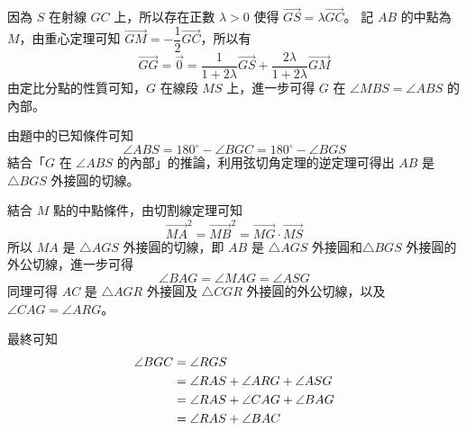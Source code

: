 \setcounter{equation}{0}
因為 $S$ 在射線 $GC$ 上，所以存在正數 $\lambda > 0$ 使得 $\overrightarrow{GS}=\lambda\overrightarrow{GC}$。
記 $AB$ 的中點為 $M$，由重心定理可知 $\overrightarrow{GM}=-\dfrac{1}{2}\overrightarrow{GC}$，所以有
\begin{equation}
  \overrightarrow{GG}=\overrightarrow{0}=\frac{1}{1+2\lambda}\overrightarrow{GS}+\frac{2\lambda}{1+2\lambda}\overrightarrow{GM}
\end{equation}
由定比分點的性質可知，$G$ 在線段 $MS$ 上，進一步可得 $G$ 在 $\angle{MBS}=\angle{ABS}$ 的內部。

由題中的已知條件可知
\begin{equation}
  \angle{ABS}=180^{\circ}-\angle{BGC}=180^{\circ}-\angle{BGS}
\end{equation}
結合「$G$ 在 $\angle{ABS}$ 的內部」的推論，利用弦切角定理的逆定理可得出 $AB$ 是 $\triangle{BGS}$ 外接圓的切線。

結合 $M$ 點的中點條件，由切割線定理可知
\begin{equation}
  \overrightarrow{MA}^2=\overrightarrow{MB}^2=\overrightarrow{MG}\cdot\overrightarrow{MS}
\end{equation}
所以 $MA$ 是 $\triangle{AGS}$ 外接圓的切線，即 $AB$ 是 $\triangle{AGS}$ 外接圓和$\triangle{BGS}$ 外接圓的外公切線，進一步可得
\begin{equation}
  \angle{BAG}=\angle{MAG}=\angle{ASG}\label{eq:p5_s1}
\end{equation}
同理可得 $AC$ 是 $\triangle{AGR}$ 外接圓及 $\triangle{CGR}$ 外接圓的外公切線，以及 $\angle{CAG}=\angle{ARG}$。

最終可知
\begin{align}
  \angle{BGC}&=\angle{RGS}\notag\\
  &=\angle{RAS}+\angle{ARG}+\angle{ASG}\notag\\
  &=\angle{RAS}+\angle{CAG}+\angle{BAG}\notag\\
  &=\angle{RAS}+\angle{BAC}
\end{align}